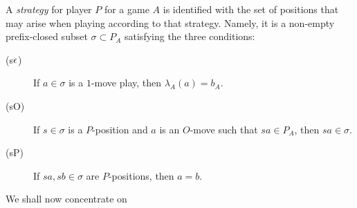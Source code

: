 \documentclass[11pt]{article}
\begin{document}
A \emph{strategy} for player $P$ for a game $A$ is identified with the set of positions that may arise when playing according to that strategy.  Namely, it is a non-empty prefix-closed subset $\sigma\subset P_A$ satisfying the three conditions:
\begin{description}
  \item[(s$\epsilon$)] If $a\in\sigma$ is a $1$-move play, then $\lambda_A(a)=b_A$.
  \item[(sO)] If $s\in\sigma$ is a $P$-position and $a$ is an $O$-move such that $sa\in P_A$, then $sa\in\sigma$.
  \item[(sP)] If $sa,sb\in\sigma$ are $P$-positions, then $a=b$.
\end{description}

We shall now concentrate on 



\end{document}
